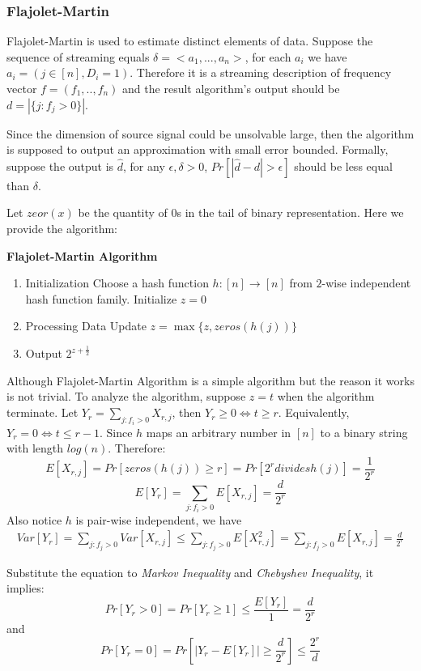 \documentclass{article} %
\begin{document}
\subsubsection{Flajolet-Martin}
Flajolet-Martin is used to estimate distinct elements of data. Suppose the sequence of streaming equals $\delta = <a_1, ..., a_n>$, for each $a_i$ we have $a_i = (j \in [n], D_i = 1)$. Therefore it is a streaming description of frequency vector $f = (f_1, .., f_n)$ and the result algorithm's output should be $d = |\{j : f_j > 0\}|$.

Since the dimension of source signal could be unsolvable large, then the algorithm is supposed to output an approximation with small error bounded. Formally, suppose the output is $\hat{d}$, for any $\epsilon, \delta > 0$, $Pr[|\hat{d}-d|>\epsilon]$ should be less equal than $\delta$.

Let $zeor(x)$ be the quantity of $0$s in the tail of binary representation. Here we provide the algorithm:

\textbf{Flajolet-Martin Algorithm}
\begin{enumerate}
\item Initialization
\subitem Choose a hash function $h:[n] \rightarrow [n]$ from $2$-wise independent hash function family.
\subitem Initialize $z = 0$
\item Processing Data
\subitem Update $z = \max\{z, zeros(h(j))\}$
\item Output
\subitem $2^{z+\frac{1}{2}}$
\end{enumerate}
Although Flajolet-Martin Algorithm is a simple algorithm but the reason it works is not trivial. To analyze the algorithm, suppose $z = t$ when the algorithm terminate. Let $Y_r = \sum_{j:f_i>0}X_{r,j}$, then $Y_r \ge 0 \Leftrightarrow t \ge r$. Equivalently, $Y_r = 0 \Leftrightarrow t \le r - 1$. Since $h$ maps an arbitrary number in $[n]$ to a binary string with length $log(n)$. Therefore:
$$E[X_{r, j}] = Pr[zeros(h(j)) \ge r] = Pr[2^r divides h(j)] = \frac{1}{2^r}$$
$$E[Y_r] = \sum_{j:f_i > 0}E[X_{r,j}] = \frac{d}{2^r}$$
Also notice $h$ is pair-wise independent, we have
\begin{eqnarray*}
Var[Y_r] = \sum_{j:f_j>0}Var[X_{r,j}]
\le \sum_{j:f_j>0}E[X^2_{r,j}]
=\sum_{j:f_j>0}E[X_{r, j}]
=\frac{d}{2^r}
\end{eqnarray*}

Substitute the equation to \emph{Markov Inequality} and \emph{Chebyshev Inequality}, it implies:
$$Pr[Y_r > 0] = Pr[Y_r \ge 1] \le \frac{E[Y_r]}{1} = \frac{d}{2^r}$$
and
$$Pr[Y_r = 0] = Pr[|Y_r - E[Y_r]| \ge \frac{d}{2^r}] \le \frac{2^r}{d}$$
\end{document}
